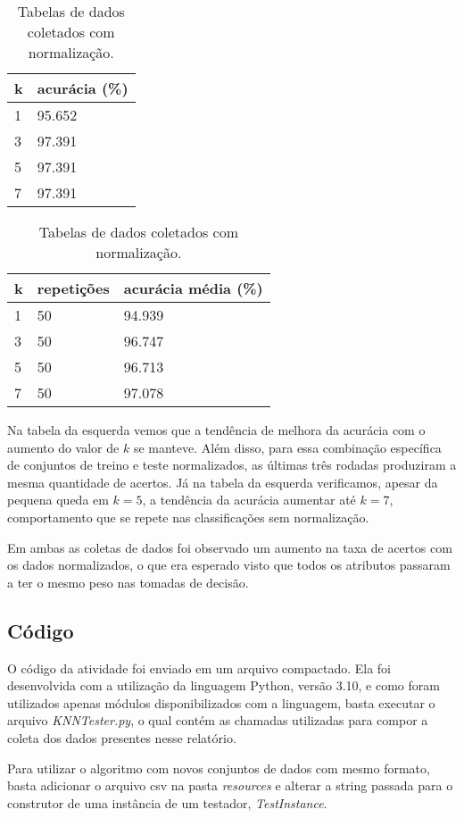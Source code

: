 \documentclass{article}
\begin{document}
\bigskip
\begin{table}[h]
\begin{center}
    \begin{tabular}{ | m{2em} | m{10em} | }
    \hline
    k & acurácia (\%) \\
    \hline
    1 & 95.652 \\
    3 & 97.391 \\
    5 & 97.391 \\
    7 & 97.391 \\
    \hline
    \end{tabular}
    \hspace{20pt}%
    \begin{tabular}{ | m{2em} | m{5em} | m{10em} | }
    \hline
    k & repetições & acurácia média (\%) \\
    \hline
    1 & 50 & 94.939 \\
    3 & 50 & 96.747 \\
    5 & 50 & 96.713 \\
    7 & 50 & 97.078 \\
    \hline
    \end{tabular}
\caption{Tabelas de dados coletados com normalização.}
\end{center}
\end{table}

Na tabela da esquerda vemos que a tendência de melhora da acurácia com o aumento do valor de \(k\) se manteve. Além disso, para essa combinação específica de conjuntos de treino e teste normalizados, as últimas três rodadas produziram a mesma quantidade de acertos. Já na tabela da esquerda verificamos, apesar da pequena queda em \(k = 5\), a tendência da acurácia aumentar até \(k = 7\), comportamento que se repete nas classificações sem normalização.

Em ambas as coletas de dados foi observado um aumento na taxa de acertos com os dados normalizados, o que era esperado visto que todos os atributos passaram a ter o mesmo peso nas tomadas de decisão.

\subsection*{Código}

O código da atividade foi enviado em um arquivo compactado. Ela foi desenvolvida com a utilização da linguagem Python, versão 3.10, e como foram utilizados apenas módulos disponibilizados com a linguagem, basta executar o arquivo \emph{KNNTester.py}, o qual contém as chamadas utilizadas para compor a coleta dos dados presentes nesse relatório.

Para utilizar o algoritmo com novos conjuntos de dados com mesmo formato, basta adicionar o arquivo csv na pasta \emph{resources} e alterar a string passada para o construtor de uma instância de um testador, \emph{TestInstance}.
\end{document}
